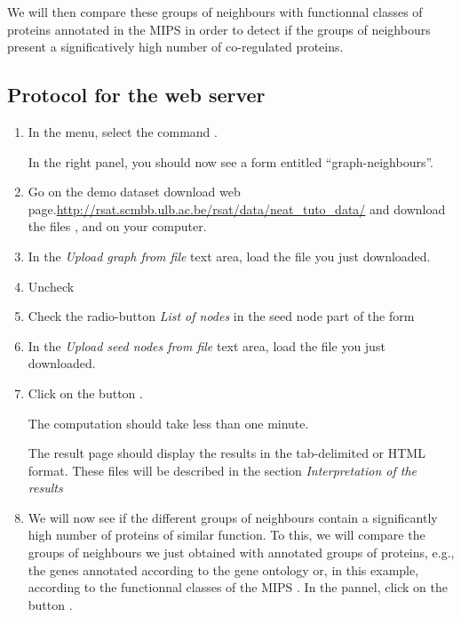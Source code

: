 We will then compare these groups of neighbours with functionnal classes of proteins annotated in the MIPS \cite{Mewes2007} in order to detect if the groups of neighbours present a significatively high number of co-regulated proteins.



\subsection{Protocol for the web server}

\begin{enumerate}

\item In the \neat menu, select the command . 

  In the right panel, you should now see a form entitled
  ``graph-neighbours''.

\item Go on the demo dataset download web page.\url{http://rsat.scmbb.ulb.ac.be/rsat/data/neat\_tuto\_data/} and download the files ,  and  on your computer.

\item In the \textit{Upload graph from file} text area, load the file  you just downloaded.
\item Uncheck 
\item Check the radio-button \textit{List of nodes} in the seed node part of the form
\item In the \textit{Upload seed nodes from file} text area, load the file  you just downloaded.
\item Click on the button . 

  The computation should take less than one minute.
  
  The result page should display the results in the tab-delimited or HTML format. These files will be described in the section \textit{Interpretation of the results}

\item We will now see if the different groups of neighbours contain a significantly high number of proteins of similar
function. To this, we will compare the groups of neighbours we just obtained with annotated groups of proteins, e.g., the genes annotated according to the gene ontology \cite{GO2007} or, in this example, according to the functionnal classes of the MIPS \cite{Mewes2007}. In the  pannel, click on the button . 


\end{enumerate}
